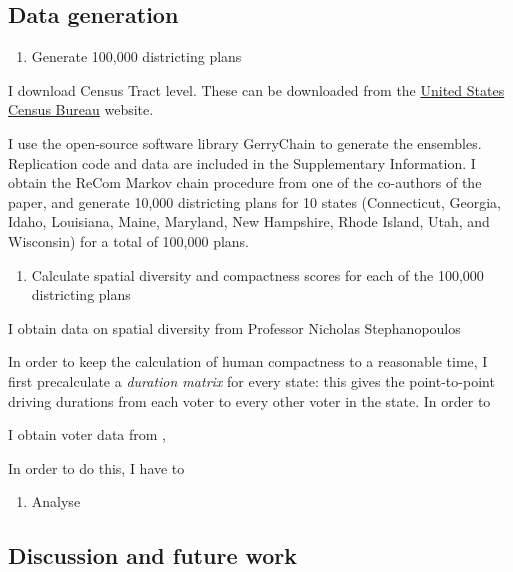\documentclass[]{article}
\providecommand{\tightlist}{%
  \setlength{\itemsep}{0pt}\setlength{\parskip}{0pt}}
\begin{document}
\hypertarget{data-generation}{%
\subsection{Data generation}\label{data-generation}}

\begin{enumerate}
\def\labelenumi{\arabic{enumi}.}
\tightlist
\item
  Generate 100,000 districting plans
\end{enumerate}

I download Census Tract level. These can be downloaded from the
\href{census.gov}{United States Census Bureau} website.

I use the open-source software library GerryChain to generate the
ensembles. Replication code and data are included in the Supplementary
Information. I obtain the ReCom Markov chain procedure from one of the
co-authors of the \cite{ddj2019recom} paper, and generate 10,000
districting plans for 10 states (Connecticut, Georgia, Idaho, Louisiana,
Maine, Maryland, New Hampshire, Rhode Island, Utah, and Wisconsin) for a
total of 100,000 plans.

\begin{enumerate}
\def\labelenumi{\arabic{enumi}.}
\setcounter{enumi}{1}
\tightlist
\item
  Calculate spatial diversity and compactness scores for each of the
  100,000 districting plans
\end{enumerate}

I obtain data on spatial diversity from Professor Nicholas
Stephanopoulos

In order to keep the calculation of human compactness to a reasonable
time, I first precalculate a \emph{duration matrix} for every state:
this gives the point-to-point driving durations from each voter to every
other voter in the state. In order to

I obtain voter data from \citeauthor{er2019},

In order to do this, I have to

\begin{enumerate}
\def\labelenumi{\arabic{enumi}.}
\setcounter{enumi}{2}
\tightlist
\item
  Analyse
\end{enumerate}

\hypertarget{discussion-and-future-work}{%
\subsection{Discussion and future
work}\label{discussion-and-future-work}}
\end{document}
